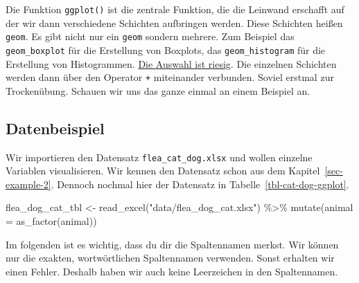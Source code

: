 \documentclass[
  letterpaper,
]{scrbook}
\newenvironment{Shaded}{\begin{snugshade}}{\end{snugshade}}
\newcommand{\AttributeTok}[1]{\textcolor[rgb]{0.40,0.45,0.13}{#1}}
\newcommand{\FunctionTok}[1]{\textcolor[rgb]{0.28,0.35,0.67}{#1}}
\newcommand{\NormalTok}[1]{\textcolor[rgb]{0.00,0.23,0.31}{#1}}
\newcommand{\OtherTok}[1]{\textcolor[rgb]{0.00,0.23,0.31}{#1}}
\newcommand{\SpecialCharTok}[1]{\textcolor[rgb]{0.37,0.37,0.37}{#1}}
\newcommand{\StringTok}[1]{\textcolor[rgb]{0.13,0.47,0.30}{#1}}
\begin{document}
Die Funktion \texttt{ggplot()} ist die zentrale Funktion, die die
Leinwand erschafft auf der wir dann verschiedene Schichten aufbringen
werden. Diese Schichten heißen \texttt{geom}. Es gibt nicht nur ein
\texttt{geom} sondern mehrere. Zum Beispiel das \texttt{geom\_boxplot}
für die Erstellung von Boxplots, das \texttt{geom\_histogram} für die
Erstellung von Histogrammen.
\href{https://ggplot2.tidyverse.org/reference/index.html}{Die Auswahl
ist riesig}. Die einzelnen Schichten werden dann über den Operator
\texttt{+} miteinander verbunden. Soviel erstmal zur Trockenübung.
Schauen wir uns das ganze einmal an einem Beispiel an.

\hypertarget{datenbeispiel}{%
\subsection{Datenbeispiel}\label{datenbeispiel}}

Wir importieren den Datensatz \texttt{flea\_cat\_dog.xlsx} und wollen
einzelne Variablen visualisieren. Wir kennen den Datensatz schon aus dem
Kapitel~\ref{sec-example-2}. Dennoch nochmal hier der Datensatz in
Tabelle~\ref{tbl-cat-dog-ggplot}.

\begin{Shaded}
\begin{Highlighting}[]
\NormalTok{flea\_dog\_cat\_tbl }\OtherTok{\textless{}{-}} \FunctionTok{read\_excel}\NormalTok{(}\StringTok{"data/flea\_dog\_cat.xlsx"}\NormalTok{) }\SpecialCharTok{\%\textgreater{}\%} 
  \FunctionTok{mutate}\NormalTok{(}\AttributeTok{animal =} \FunctionTok{as\_factor}\NormalTok{(animal))}
\end{Highlighting}
\end{Shaded}

{}

Im folgenden ist es wichtig, dass du dir die Spaltennamen merkst. Wir
können nur die exakten, wortwörtlichen Spaltennamen verwenden. Sonst
erhalten wir einen Fehler. Deshalb haben wir auch keine Leerzeichen in
den Spaltennamen.
\end{document}
